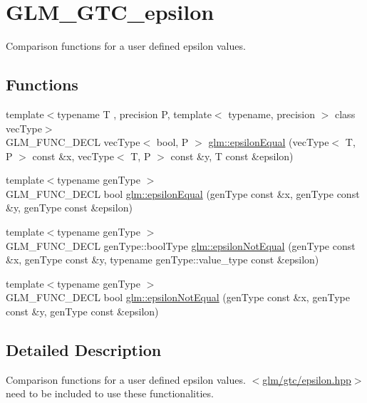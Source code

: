 \hypertarget{group__gtc__epsilon}{\section{G\-L\-M\-\_\-\-G\-T\-C\-\_\-epsilon}
\label{group__gtc__epsilon}
}


Comparison functions for a user defined epsilon values.  


\subsection*{Functions}
\begin{DoxyCompactItemize}
\item 
{\footnotesize template$<$typename T , precision P, template$<$ typename, precision $>$ class vec\-Type$>$ }\\G\-L\-M\-\_\-\-F\-U\-N\-C\-\_\-\-D\-E\-C\-L vec\-Type$<$ bool, P $>$ \hyperlink{group__gtc__epsilon_gaca9443f217dc36587624247245522331}{glm\-::epsilon\-Equal} (vec\-Type$<$ T, P $>$ const \&x, vec\-Type$<$ T, P $>$ const \&y, T const \&epsilon)
\item 
{\footnotesize template$<$typename gen\-Type $>$ }\\G\-L\-M\-\_\-\-F\-U\-N\-C\-\_\-\-D\-E\-C\-L bool \hyperlink{group__gtc__epsilon_gaa7f227999ca09e7ca994e8b35aba47bb}{glm\-::epsilon\-Equal} (gen\-Type const \&x, gen\-Type const \&y, gen\-Type const \&epsilon)
\item 
{\footnotesize template$<$typename gen\-Type $>$ }\\G\-L\-M\-\_\-\-F\-U\-N\-C\-\_\-\-D\-E\-C\-L gen\-Type\-::bool\-Type \hyperlink{group__gtc__epsilon_ga14e2888a304654ade8a3996024e2739c}{glm\-::epsilon\-Not\-Equal} (gen\-Type const \&x, gen\-Type const \&y, typename gen\-Type\-::value\-\_\-type const \&epsilon)
\item 
{\footnotesize template$<$typename gen\-Type $>$ }\\G\-L\-M\-\_\-\-F\-U\-N\-C\-\_\-\-D\-E\-C\-L bool \hyperlink{group__gtc__epsilon_ga50a92103fb0cbd796908e1bf20c79aaf}{glm\-::epsilon\-Not\-Equal} (gen\-Type const \&x, gen\-Type const \&y, gen\-Type const \&epsilon)
\end{DoxyCompactItemize}


\subsection{Detailed Description}
Comparison functions for a user defined epsilon values. $<$\hyperlink{epsilon_8hpp}{glm/gtc/epsilon.\-hpp}$>$ need to be included to use these functionalities. 

